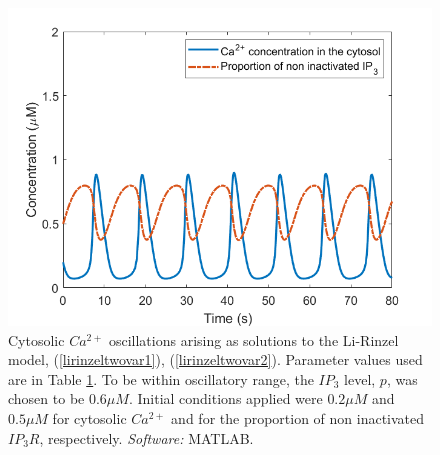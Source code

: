 \begin{figure}[h!!!t!!!b!!!p]
  \centering
  \includegraphics[width=0.7\linewidth]{Chapters/2_Ca2+_Models/extras/twovarmminimalmodel.png}
  \caption{Cytosolic $Ca^{2+}$ oscillations arising as solutions to the Li-Rinzel model, (\ref{lirinzeltwovar1}), (\ref{lirinzeltwovar2}). Parameter values used are in Table \ref{twovarminmodel}. To be within oscillatory range, the $IP_3$ level, $p$, was chosen to be $0.6 \mu M$. Initial conditions applied were $0.2\mu M$ and $0.5 \mu M$ for cytosolic $Ca^{2+}$ and for the proportion of non inactivated $IP_3R$, respectively. \textit{Software:} MATLAB. }\label{twovarminmodel}
\end{figure}

